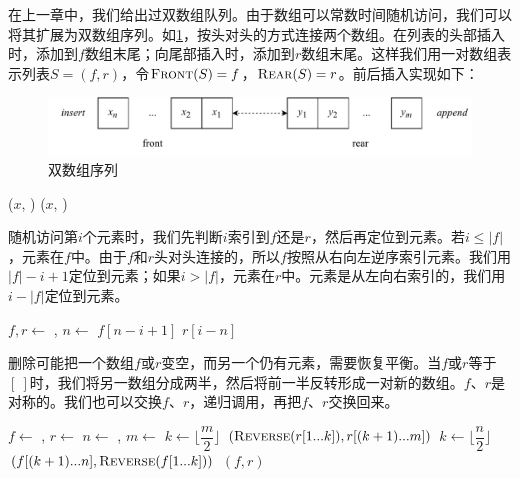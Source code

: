 \documentclass[b5paper]{ctexart}
\begin{document}
在上一章中，我们给出过双数组队列。由于数组可以常数时间随机访问，我们可以将其扩展为双数组序列。如\cref{fig:parrays}，按头对头的方式连接两个数组。在列表的头部插入时，添加到$f$数组末尾；向尾部插入时，添加到$r$数组末尾。这样我们用一对数组表示列表$S = (f, r)$，令$\textproc{Front}(S) = f$，$\textproc{Rear}(S) = r$。前后插入实现如下：

\begin{figure}[htbp]
  \centering
  \includegraphics[scale=0.7]{img/parrays}
  \caption{双数组序列}
  \label{fig:parrays}
\end{figure}

\begin{algorithmic}[1]
  \State {}($x$, )
\EndFunction
{}
  \State {}($x$, )
\EndFunction
\end{algorithmic}

随机访问第$i$个元素时，我们先判断$i$索引到$f$还是$r$，然后再定位到元素。若$ i \leq |f|$，元素在$f$中。由于$f$和$r$头对头连接的，所以$f$按照从右向左逆序索引元素。我们用$|f| - i + 1$定位到元素；如果$i > |f|$，元素在$r$中。元素是从左向右索引的，我们用$i - |f|$定位到元素。

\begin{algorithmic}[1]
  \State $f, r \gets $ , 
  \State $n \gets $ 
    \State \Return $f[n - i + 1]$ 
  \Else
    \State \Return $r[i - n]$
  \EndIf
\EndFunction
\end{algorithmic}

删除可能把一个数组$f$或$r$变空，而另一个仍有元素，需要恢复平衡。当$f$或$r$等于$[\ ]$时，我们将另一数组分成两半，然后将前一半反转形成一对新的数组。$f$、$r$是对称的。我们也可以交换$f$、$r$，递归调用，再把$f$、$r$交换回来。

\begin{algorithmic}[1]
  \State $f \gets$ , $r \gets$ 
  \State $n \gets$ , $m \gets$ 
    \State $k \gets \lfloor \dfrac{m}{2} \rfloor$
    \State \Return $(\textproc{Reverse}(r[1 ... k]), r[(k + 1) ... m])$
  \EndIf
    \State $k \gets \lfloor \dfrac{n}{2} \rfloor$
    \State \Return $(f[(k + 1) ... n], \textproc{Reverse}(f[1 ... k]))$
  \EndIf
  \State \Return $(f, r)$
\EndFunction
\end{algorithmic}
\end{document}
